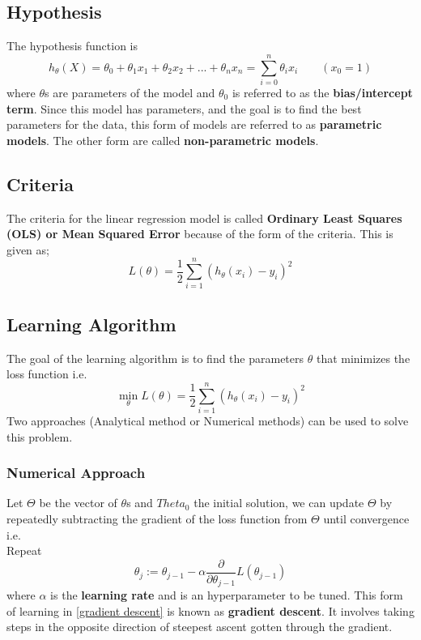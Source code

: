 \documentclass[12pt,a4paper,titlepage,landscape]{book}
\begin{document}
	\subsection{Hypothesis}
	The hypothesis function is \\
	\begin{equation}
		h_{\theta}(X) = \theta_0 + \theta_1x_1 + \theta_2x_2 + ... + \theta_nx_n
		= \sum_{i=0}^{n}\theta_ix_i \qquad (x_0=1)
	\end{equation}
	where $\theta$s are parameters of the model and $\theta_0$ is referred to as the \textbf{bias/intercept term}. Since this model has parameters, and the goal is to find the best parameters for the data, this form of models are referred to as \textbf{parametric models}. The other form are called \textbf{non-parametric models}.
	
	\subsection{Criteria}
	The criteria for the linear regression model is called \textbf{Ordinary Least Squares (OLS) or Mean Squared Error} because of the form of the criteria.  This is given as;
	\begin{equation}\label{loss_function}
	L(\theta) = \dfrac{1}{2}\sum_{i=1}^{n}\left(h_\theta(x_i) - y_i\right)^2
	\end{equation}
	
	\subsection{Learning Algorithm}
	The goal of the learning algorithm is to find the parameters $\theta$ that minimizes the loss function i.e. \\ $$ \min\limits_{\theta}L(\theta) = \dfrac{1}{2}\sum_{i=1}^{n}\left(h_\theta(x_i) - y_i\right)^2 $$
	Two approaches (Analytical method or Numerical methods) can be used to solve this problem.
	
	\subsubsection{Numerical Approach}
	Let $\Theta$ be the vector of $\theta$s and $Theta_0$ the initial solution, we can update $\Theta$ by repeatedly subtracting the gradient of the loss function from $\Theta$ until convergence i.e. \\
	Repeat 
	\begin{equation}\label{gradient descent}
	\theta_j := \theta_{j-1} - \alpha\dfrac{\partial}{\partial\theta_{j-1}}L(\theta_{j-1})
	\end{equation} where $\alpha$ is the \textbf{learning rate} and is an hyperparameter to be tuned.
	This form of learning in \eqref{gradient descent} is known as \textbf{gradient descent}. It involves taking steps in the opposite direction of steepest ascent gotten through the gradient.
	
\end{document}
